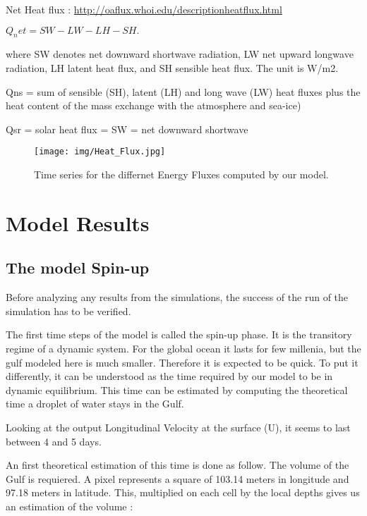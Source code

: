\documentclass[english]{PFeENSTA}
\begin{document}
{Net Heat flux : \url{http://oaflux.whoi.edu/descriptionheatflux.html}
 
 $Q_net = SW- LW - LH - SH. $
 
where SW denotes net downward shortwave radiation, LW net upward longwave radiation, LH latent heat flux, and SH sensible heat flux. The unit is W/m2. 

Qns = sum of sensible (SH), latent (LH) and long wave (LW) heat fluxes plus the heat content
of the mass exchange with the atmosphere and sea-ice)

Qsr = solar heat flux = SW = net downward shortwave 


 
 \begin{figure}[H]
   \begin{minipage}[h!]{1\linewidth}
   \centering
   \texttt{[image: img/Heat\_Flux.jpg]}
   \end{minipage}
  \caption{\label{fig:Heat Flux}Time series for the differnet Energy Fluxes computed by our model.}
\end{figure}


\chapter{Model Results}


\section{The model Spin-up}
Before analyzing any results from the simulations, the success of the run of the simulation has to be verified. 

The first time steps of the model is called the spin-up phase. It is the transitory regime of a dynamic system. For the global ocean it lasts for few millenia, but the gulf modeled here is much smaller. Therefore it is expected to be quick. To put it differently, it can be understood as the time required by our model to be in dynamic equilibrium. This time can be estimated by computing the theoretical time a droplet of water stays in the Gulf.

Looking at the output Longitudinal Velocity at the surface (U), it seems to last between 4 and 5 days.

An first theoretical estimation of this time is done as follow.
The volume of the Gulf is requiered. A pixel represents a square of 103.14 meters in longitude and 97.18 meters in latitude. This, multiplied on each cell by the local depths gives us an estimation of the volume  : 
\begin{center}


\end{center}}
\end{document}
